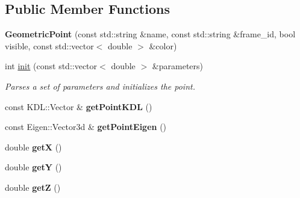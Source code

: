 \subsection*{Public Member Functions}
\begin{DoxyCompactItemize}
\item 
\hypertarget{classhiqp_1_1geometric__primitives_1_1GeometricPoint_a4e3dd5ac625cac7ccf795b6b2f1facfd}{{\bfseries Geometric\-Point} (const std\-::string \&name, const std\-::string \&frame\-\_\-id, bool visible, const std\-::vector$<$ double $>$ \&color)}\label{classhiqp_1_1geometric__primitives_1_1GeometricPoint_a4e3dd5ac625cac7ccf795b6b2f1facfd}

\item 
int \hyperlink{classhiqp_1_1geometric__primitives_1_1GeometricPoint_a2e055a55316c83c22a26ba85e9da975d}{init} (const std\-::vector$<$ double $>$ \&parameters)
\begin{DoxyCompactList}\small\item\em Parses a set of parameters and initializes the point. \end{DoxyCompactList}\item 
\hypertarget{classhiqp_1_1geometric__primitives_1_1GeometricPoint_a5515141a01be0bc90421a530cc72fe32}{const K\-D\-L\-::\-Vector \& {\bfseries get\-Point\-K\-D\-L} ()}\label{classhiqp_1_1geometric__primitives_1_1GeometricPoint_a5515141a01be0bc90421a530cc72fe32}

\item 
\hypertarget{classhiqp_1_1geometric__primitives_1_1GeometricPoint_a56500d7851c6488ece9fe62c57ee4ea0}{const Eigen\-::\-Vector3d \& {\bfseries get\-Point\-Eigen} ()}\label{classhiqp_1_1geometric__primitives_1_1GeometricPoint_a56500d7851c6488ece9fe62c57ee4ea0}

\item 
\hypertarget{classhiqp_1_1geometric__primitives_1_1GeometricPoint_a573b66ccd7b4a2071ddce07f479ebfb5}{double {\bfseries get\-X} ()}\label{classhiqp_1_1geometric__primitives_1_1GeometricPoint_a573b66ccd7b4a2071ddce07f479ebfb5}

\item 
\hypertarget{classhiqp_1_1geometric__primitives_1_1GeometricPoint_a40fb3e3735c431b798b836c68dd82e89}{double {\bfseries get\-Y} ()}\label{classhiqp_1_1geometric__primitives_1_1GeometricPoint_a40fb3e3735c431b798b836c68dd82e89}

\item 
\hypertarget{classhiqp_1_1geometric__primitives_1_1GeometricPoint_a4786d47f1c74466c1a703a53379cddd9}{double {\bfseries get\-Z} ()}\label{classhiqp_1_1geometric__primitives_1_1GeometricPoint_a4786d47f1c74466c1a703a53379cddd9}

\end{DoxyCompactItemize}
